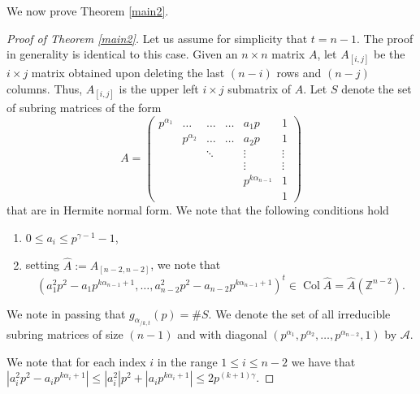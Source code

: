 \documentclass[a4paper]{amsart}
\numberwithin{equation}{section}
\theoremstyle{remark}
\newcommand{\Z}{\mathbb{Z}}
\newcommand{\op}[1]{\operatorname{#1}}
\begin{document}
\par We now prove Theorem \ref{main2}.
\begin{proof}[Proof of Theorem \ref{main2}]
\par Let us assume for simplicity that $t=n-1$. The proof in generality is identical to this case. Given an $n\times n$ matrix $A$, let $A_{[i,j]}$ be the $i\times j$ matrix obtained upon deleting the last $(n-i)$ rows and $(n-j)$ columns. Thus, $A_{[i,j]}$ is the upper left $i\times j$ submatrix of $A$. Let $S$ denote the set of subring matrices of the form
$$A = \begin{pmatrix}
p^{\alpha_1} & \dots & \dots & \dots & a_1p & 1\\
 & p^{\alpha_2} & \dots & \dots & a_2p & 1\\
 &  & \ddots &  & \vdots & \vdots \\ 
 &  &   & & \vdots & \vdots\\
 &  &  &  & p^{k\alpha_{n-1}} & 1\\
 & &   &  &  & 1
\end{pmatrix}$$
that are in Hermite normal form. We note that the following conditions hold
\begin{enumerate}
    \item $0 \leq a_i \leq p^{\gamma-1}-1$,
    \item setting $\hat{A}:=A_{[n-2, n-2]}$, we note that \[(a_1^2p^2-a_1p^{k\alpha_{n-1}+1}, \dots, a_{n-2}^2p^2 - a_{n-2}p^{k\alpha_{n-1}+1})^t \in \op{Col}\hat{A}=\hat{A}(\Z^{n-2}).\]
\end{enumerate}
We note in passing that $g_{\alpha_{/k,t}}(p)= \#S$. We denote the set of all irreducible subring matrices of size $(n-1)$ and with diagonal $(p^{\alpha_1},p^{\alpha_2},\dots,p^{\alpha_{n-2}}, 1)$ by $\mathcal{A}$. 
\par We note that for each index $i$ in the range $1 \leq i \leq n-2$ we have that $|a_i^2p^2-a_ip^{k\alpha_i+1}| \leq |a_i^2|p^2 + |a_ip^{k\alpha_i+1}| \leq 2p^{(k+1)\gamma}$. 


\end{proof}
\end{document}
